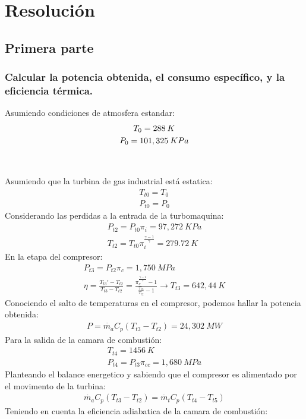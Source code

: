 \documentclass{report}
\begin{document}
\section{Resolución}
\subsection{Primera parte}
\subsubsection{Calcular la potencia obtenida, el consumo específico, y la eficiencia térmica.}
Asumiendo condiciones de atmosfera estandar:
\begin{gather}
  T_0 = 288\:K\\
  \vspace{1cm}
  P_0 = 101,325\:KPa
\end{gather}
Asumiendo que la turbina de gas industrial está estatica:
\begin{gather}
  T_{t0} = T_0\\
  P_{t0} = P_0
\end{gather}
Considerando las perdidas a la entrada de la turbomaquina:
\begin{gather}
  P_{t2} = P_{t0} \pi_i=97,272\:KPa\\
  T_{t2} = T_{t0} \pi_i^{\frac{\gamma-1}{\gamma}} = 279.72\:K
\end{gather}
En la etapa del compresor:
\begin{gather}
  P_{t3} = P_{t2} \pi_c=1,750\:MPa\\
  \eta = \frac{T_{t3}'-T_{t2}}{T_{t3}-T_{t2}}=\frac{\pi_c^\frac{\gamma-1}{\gamma}-1}{\frac{T_{t3}}{T_{t2}}-1}\xrightarrow{}T_{t3} = 642,44\:K
\end{gather}
Conociendo el salto de temperaturas en el compresor, podemos hallar la potencia obtenida:
\begin{gather}
  P=\Dot{m_a}C_p(T_{t3}-T_{t2})=\boxed{24,302\:MW}
\end{gather}
Para la salida de la camara de combustión:
\begin{gather}
  T_{t4} = 1456\:K\\
  P_{t4} = P_{t3} \pi_{cc}=1,680\:MPa
\end{gather}
Planteando el balance energetico y sabiendo que el compresor es alimentado por el movimento de la turbina: 
\begin{gather}
  \Dot{m_a}C_p(T_{t3}-T_{t2})=\Dot{m_t}C_p(T_{t4}-T_{t5})
\end{gather}
Teniendo en cuenta la eficiencia adiabatica de la camara de combustión:
\end{document}
